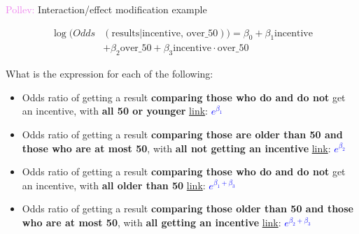 \documentclass[10pt,t]{beamer}
\begin{document}
\begin{frame}{\textcolor{violet}{Pollev:} Interaction/effect modification example}
	
	\vspace{-5 mm}
	
	\color{blue}
	\begin{align*}
	\log(Odds&(\text{results}|\text{incentive, over\_50})) = \beta_0 + \beta_1\text{incentive}\\&+\beta_2\text{over\_50}+\beta_3\text{incentive}\cdot\text{over\_50}
	\end{align*}
	\color{black}
	
	\vspace{-2 mm}
	
	What is the expression for each of the following:
	
	\medskip
	
	\begin{itemize}
		\item Odds ratio of getting a result \textbf{comparing those who do and do not} get an incentive, with \textbf{all 50 or younger} \textcolor{purple}{\href{https://PollEv.com/multiple_choice_polls/BTSCKv3ofieOMwW8bEYwT/respond}{link}}: \textcolor{blue}{$e^{\beta_1}$}
		
		\medskip
		
		\item Odds ratio of getting a result \textbf{comparing those are older than 50 and those who are at most 50}, with \textbf{all not getting an incentive} \textcolor{purple}{\href{https://PollEv.com/multiple_choice_polls/M9GzJr976YmfdwfTmqNUB/respond}{link}}:  \textcolor{blue}{$e^{\beta_2}$}
		
		\medskip
		
		\item Odds ratio of getting a result \textbf{comparing those who do and do not} get an incentive, with \textbf{all older than 50} \textcolor{purple}{\href{https://PollEv.com/multiple_choice_polls/QlJlfru1e0LWCDAjbmbHe/respond}{link}}: \textcolor{blue}{$e^{\beta_1+\beta_3}$}
		
		\medskip
		
		\item Odds ratio of getting a result \textbf{comparing those older than 50 and those who are at most 50}, with \textbf{all getting an incentive} \textcolor{purple}{\href{https://PollEv.com/multiple_choice_polls/uclSu0e57aLCbVT1ElIlw/respond}{link}}:   \textcolor{blue}{$e^{\beta_2+\beta_3}$}
		
		
		
	\end{itemize}
	
\end{frame}
\end{document}
